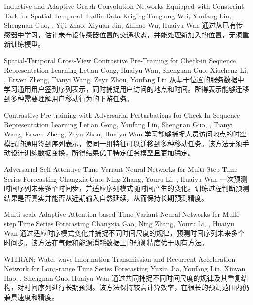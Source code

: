 {Inductive and Adaptive Graph Convolution Networks Equipped with Constraint Task for Spatial-Temporal Traffic Data Kriging}
{Tonglong Wei, Youfang Lin, Shengnan Guo, \me, Yiji Zhao, Xiyuan Jin, Zhihao Wu, Huaiyu Wan}
{通过从已有传感器中学习，估计未布设传感器位置的交通状态，并能处理新加入的位置，无须重新训练模型。}

{Spatial-Temporal Cross-View Contrastive Pre-Training for Check-in Sequence Representation Learning}
{Letian Gong, Huaiyu Wan, Shengnan Guo, Xiucheng Li, \me, Erwen Zheng, Tianyi Wang, Zeyu Zhou, Youfang Lin}
{从基于位置的服务数据中学习通用用户签到序列表示，同时捕捉用户访问的地点和时间。所得表示能够迁移到多种需要理解用户移动行为的下游任务。}

{Contrastive Pre-training with Adversarial Perturbations for Check-In Sequence Representation Learning}
{Letian Gong, Youfang Lin, Shengnan Guo, \me, Tianyi Wang, Erwen Zheng, Zeyu Zhou, Huaiyu Wan}
{学习能够捕捉人员访问地点的时空模式的通用签到序列表示，使同一组特征可以迁移到多种移动任务。该方法无须手动设计训练数据变换，所得结果优于特定任务模型且更加稳定。}

{Adversarial Self-Attentive Time-Variant Neural Networks for Multi-Step Time Series Forecasting}
{Changxia Gao, Ning Zhang, Youru Li, \me, Huaiyu Wan}
{一次预测时间序列未来多个时间步，并适应序列模式随时间产生的变化。训练过程判断预测结果是否真实并能否从近期输入自然延续，从而保持长期预测精度。}

{Multi-scale Adaptive Attention-based Time-Variant Neural Networks for Multi-step Time Series Forecasting}
{Changxia Gao, Ning Zhang, Youru Li, \me, Huaiyu Wan}
{通过适应时序模式变化并捕捉不同时间尺度的规律，预测时间序列未来多个时间步。该方法在气候和能源消耗数据上的预测精度优于现有方法。}

{WITRAN: Water-wave Information Transmission and Recurrent Acceleration Network for Long-range Time Series Forecasting}
{Yuxin Jia, Youfang Lin, Xinyan Hao, \me, Shengnan Guo, Huaiyu Wan}
{通过共同捕捉不同时间尺度的规律及其重复结构，对时间序列进行长期预测。该方法保持较高计算效率，在很长的预测范围内仍兼具速度和精度。}
